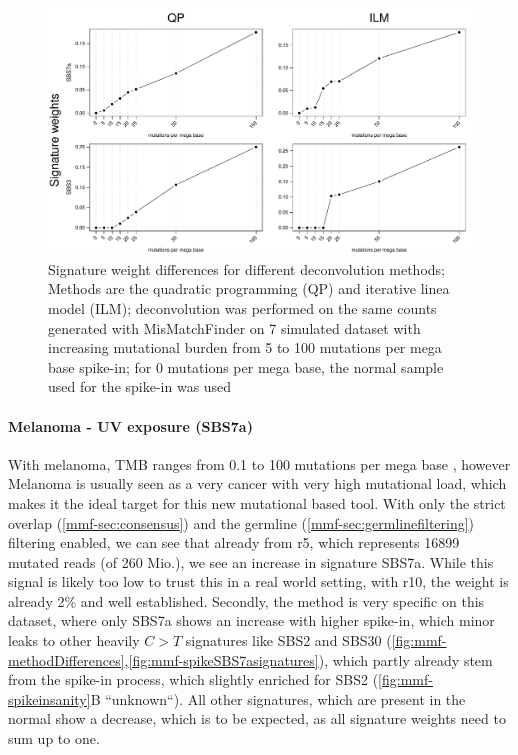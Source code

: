 \begin{figure}[!ht]
\centering
\includegraphics[width=.99\linewidth]{Figures/deconstructionMethodsDifferences.pdf}
\caption[Signature weight differences for different deconvolution methods]{Signature weight differences for different deconvolution methods; Methods are the quadratic programming (QP) and iterative linea model (ILM); deconvolution was performed on the same counts generated with MisMatchFinder on 7 simulated dataset with increasing mutational burden from 5 to 100 mutations per mega base spike-in; for 0 mutations per mega base, the normal sample used for the spike-in was used}\label{fig:mmf-methodDifferences}
\end{figure}


\paragraph{Melanoma - UV exposure (SBS7a)}
\label{mmf-sec:melaSim}

With melanoma, TMB ranges from 0.1 to 100 mutations per mega base \cite{Alexandrov2020}, however Melanoma is usually seen as a very cancer with very high mutational load, which makes it the ideal target for this new mutational based tool. With only the strict overlap (\autoref{mmf-sec:consensus}) and the germline (\autoref{mmf-sec:germlinefiltering}) filtering enabled, we can see that already from r5, which represents 16899 mutated reads (of 260 Mio.), we see an increase in signature SBS7a. While this signal is likely too low to trust this in a real world setting, with r10, the weight is already 2\% and well established. Secondly, the method is very specific on this dataset, where only SBS7a shows an increase with higher spike-in, which minor leaks to other heavily $C>T$ signatures like SBS2 and SBS30 (\autoref{fig:mmf-methodDifferences},\autoref{fig:mmf-spikeSBS7asignatures}), which partly already stem from the spike-in process, which slightly enriched for SBS2 (\autoref{fig:mmf-spikeinsanity}B ``unknown``). All other signatures, which are present in the normal show a decrease, which is to be expected, as all signature weights need to sum up to one.


